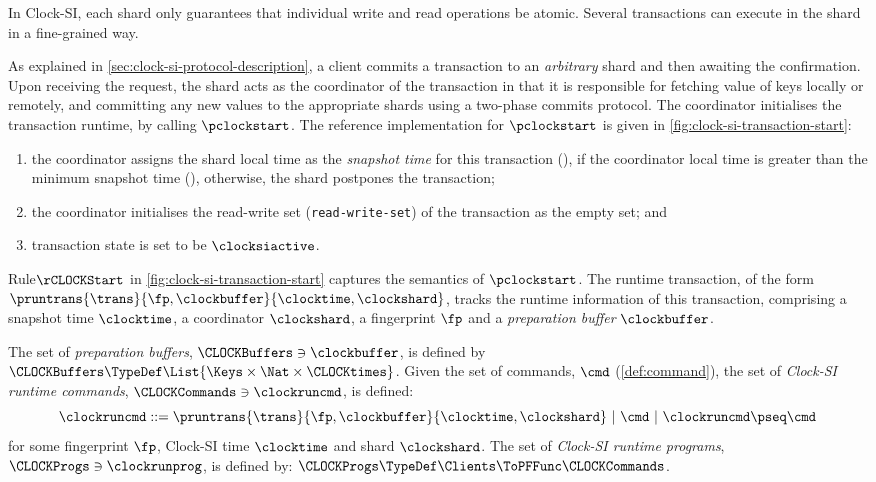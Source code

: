 In Clock-SI, each shard only guarantees that individual write and read operations be atomic.
Several transactions can execute in the shard in a fine-grained way.

As explained in \cref{sec:clock-si-protocol-description},
a client commits a transaction to an \emph{arbitrary} shard and then awaiting the confirmation.
Upon receiving the request, 
the shard acts as the coordinator of the transaction in that 
it is responsible for fetching value of keys locally or remotely,
and committing any new values to the appropriate shards using a two-phase commits protocol.
The coordinator initialises the transaction runtime, by calling \( \pclockstart \).
The reference implementation for \(  \pclockstart  \) is given in \cref{fig:clock-si-transaction-start}:
\begin{enumerate}
\item the coordinator assigns the shard local time as the \emph{snapshot time} for this transaction (),
if the coordinator local time is greater than the minimum snapshot time (),
otherwise, the shard postpones the transaction;
\item the coordinator initialises the read-write set (\verb|read-write-set|) 
of the transaction as the empty set;
and \item transaction state is set to be \( \clocksiactive\).
\end{enumerate}

Rule\( \rCLOCKStart\) in \cref{fig:clock-si-transaction-start} captures the semantics of \(  \pclockstart  \).
The runtime transaction, of the form \( \pruntrans{\trans}{\fp,\clockbuffer}{\clocktime,\clockshard} \),
tracks the runtime information of this transaction, 
comprising a snapshot time \( \clocktime \), a coordinator \( \clockshard \),
a fingerprint \( \fp \) and a \emph{preparation buffer} \( \clockbuffer \).

\begin{definition}
The set of \emph{preparation buffers}, \( \CLOCKBuffers \ni \clockbuffer \),
is defined by \( \CLOCKBuffers \TypeDef \List{\Keys \times \Nat \times \CLOCKtimes } \).
Given the set of commands, \( \cmd \) (\cref{def:command}),
the set of \emph{Clock-SI runtime commands}, \( \CLOCKCommands \ni \clockruncmd \),
is defined:
\[
\clockruncmd ::= \pruntrans{\trans}{\fp,\clockbuffer}{\clocktime,\clockshard} \ | \ \cmd \ | \ \clockruncmd \pseq \cmd 
\]
for some fingerprint \( \fp \), Clock-SI time \( \clocktime \) and shard \( \clockshard \). 
The set of \emph{Clock-SI runtime programs}, \( \CLOCKProgs \ni \clockrunprog\),
is defined by: \( \CLOCKProgs \TypeDef \Clients \ToPFFunc \CLOCKCommands\).
\end{definition}

